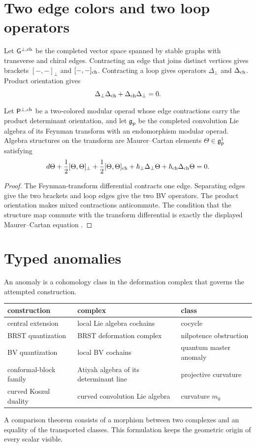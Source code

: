 \chapter{Two edge colors and two loop operators}
Let $\mathsf G^{\perp,\mathrm{ch}}$ be the completed vector space spanned by stable graphs with transverse and chiral edges. Contracting an edge that joins distinct vertices gives brackets $[-,-]_\perp$ and $[-,-]_{\mathrm{ch}}$. Contracting a loop gives operators $\Delta_\perp$ and $\Delta_{\mathrm{ch}}$. Product orientation gives
\[
 \Delta_\perp\Delta_{\mathrm{ch}}+\Delta_{\mathrm{ch}}\Delta_\perp=0.
\]

\begin{theorem}
Let $\mathsf P^{\perp,\mathrm{ch}}$ be a two-colored modular operad whose edge contractions carry the product determinant orientation, and let $\mathfrak g_{\mathsf P}$ be the completed convolution Lie algebra of its Feynman transform with an endomorphism modular operad. Algebra structures on the transform are Maurer--Cartan elements $\Theta\in\mathfrak g_{\mathsf P}^1$ satisfying
\[
 d\Theta+\frac12[\Theta,\Theta]_\perp
 +\frac12[\Theta,\Theta]_{\mathrm{ch}}
 +\hbar_\perp\Delta_\perp\Theta
 +\hbar_{\mathrm{ch}}\Delta_{\mathrm{ch}}\Theta=0.
\]
\end{theorem}
\begin{proof}
The Feynman-transform differential contracts one edge. Separating edges give the two brackets and loop edges give the two BV operators. The product orientation makes mixed contractions anticommute. The condition that the structure map commute with the transform differential is exactly the displayed Maurer--Cartan equation \cite{GetzlerKapranov}.
\end{proof}

\chapter{Typed anomalies}
An anomaly is a cohomology class in the deformation complex that governs the attempted construction.
\begin{center}
\begin{tabularx}{\textwidth}{@{}>{\raggedright\arraybackslash}p{}>{\raggedright\arraybackslash}X>{\raggedright\arraybackslash}p{}@{}}
\toprule
construction&complex&class\\ \midrule
central extension&local Lie algebra cochains&cocycle\\
BRST quantization&BRST deformation complex&nilpotence obstruction\\
BV quantization&local BV cochains&quantum master anomaly\\
conformal-block family&Atiyah algebra of its determinant line&projective curvature\\
curved Koszul duality&curved convolution Lie algebra&curvature $m_0$\\
\bottomrule
\end{tabularx}
\end{center}
A comparison theorem consists of a morphism between two complexes and an equality of the transported classes. This formulation keeps the geometric origin of every scalar visible.

